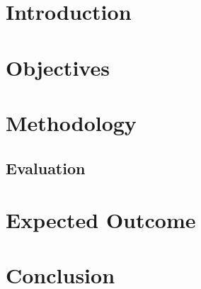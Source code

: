 \documentclass[a4paper, 12pt]{article}
\begin{document}
\newpage

\section{Introduction}

\section{Objectives}


\section{Methodology}


\subsection{Evaluation}

\section{Expected Outcome}

\section{Conclusion}
\end{document}
